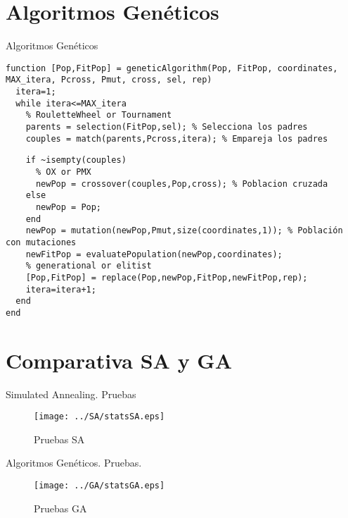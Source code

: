 \documentclass{beamer}
\begin{document}
\section{Algoritmos Genéticos}
\begin{frame}[fragile]{Algoritmos Genéticos}
\begin{verbatim}
function [Pop,FitPop] = geneticAlgorithm(Pop, FitPop, coordinates, MAX_itera, Pcross, Pmut, cross, sel, rep)
  itera=1;
  while itera<=MAX_itera
    % RouletteWheel or Tournament
    parents = selection(FitPop,sel); % Selecciona los padres
    couples = match(parents,Pcross,itera); % Empareja los padres
\end{verbatim}
\end{frame}

\begin{frame}[fragile]
\begin{verbatim}
    if ~isempty(couples)
      % OX or PMX
      newPop = crossover(couples,Pop,cross); % Poblacion cruzada
    else
      newPop = Pop;
    end
    newPop = mutation(newPop,Pmut,size(coordinates,1)); % Población con mutaciones
    newFitPop = evaluatePopulation(newPop,coordinates);
    % generational or elitist
    [Pop,FitPop] = replace(Pop,newPop,FitPop,newFitPop,rep);
    itera=itera+1;
  end
end
\end{verbatim}
\end{frame}



\section{Comparativa SA y GA}
\begin{frame}{Simulated Annealing. Pruebas}
  \begin{center}
    \begin{figure}
      \texttt{[image: ../SA/statsSA.eps]}
      \caption{Pruebas SA}
      \label{fig:statsSA}
    \end{figure}
  \end{center}
\end{frame}

\begin{frame}{Algoritmos Genéticos. Pruebas.}
  \begin{center}
    \begin{figure}
      \texttt{[image: ../GA/statsGA.eps]}
      \caption{Pruebas GA}
      \label{fig:statsGA}
    \end{figure}
  \end{center}
\end{frame}
\end{document}
